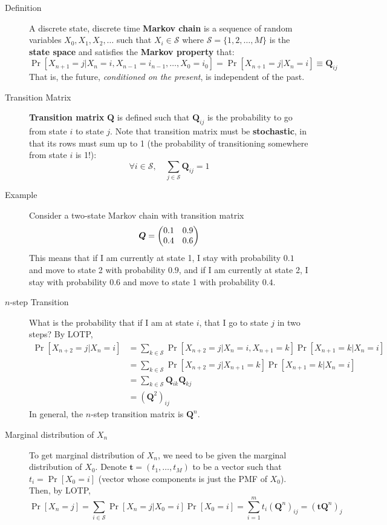 \documentclass[11pt]{article}
\theoremstyle{definition}
\theoremstyle{remark}
\begin{document}
\begin{description}

    \item[Definition] A discrete state, discrete time \textbf{Markov chain} is a sequence of random variables $X_0, X_1, X_2, \ldots$ such that $X_i \in \mathcal{S}$ where $\mathcal{S} = \{1, 2, \ldots, M\}$ is the \textbf{state space} and satisfies the \textbf{Markov property} that: $$\Pr[X_{n+1} = j | X_n = i, X_{n-1} = i_{n-1}, \ldots, X_0 = i_0 ] = \Pr[ X_{n+1} = j | X_{n} = i ] \equiv \bm{Q}_{ij}$$ That is, the future, \textit{conditioned on the present}, is independent of the past. 
    
    \item[Transition Matrix] \textbf{Transition matrix} $\bm{Q}$ is defined such that $\bm{Q}_{ij}$ is the probability to go from state $i$ to state $j$. Note that transition matrix must be \textbf{stochastic}, in that its rows must sum up to 1 (the probability of transitioning somewhere from state $i$ is 1!): $$ \forall i \in \mathcal{S}, \quad \sum_{j \in \mathcal{S}} \bm{Q}_{ij} = 1 $$ 
    
    \item[Example] Consider a two-state Markov chain with transition matrix $$\bm{Q} = \pmqty{ 0.1 & 0.9 \\ 0.4 & 0.6 } $$ This means that if I am currently at state 1, I stay with probability $0.1$ and move to state 2 with probability $0.9$, and if I am currently at state 2, I stay with probability $0.6$ and move to state 1 with probability $0.4$. 
    
    \item[$n$-step Transition] What is the probability that if I am at state $i$, that I go to state $j$ in two steps? By LOTP, \begin{align*} \Pr[X_{n+2} = j | X_{n} = i] & = \sum_{k \in \mathcal{S}} \Pr[X_{n+2} = j | X_{n} = i , X_{n+1} = k] \Pr[X_{n+1}=k | X_n = i] \\
    & = \sum_{k \in \mathcal{S}} \Pr[X_{n+2} = j | X_{n+1} = k] \Pr[X_{n+1}=k | X_n = i] \\
    & = \sum_{k \in \mathcal{S}}\bm{Q}_{ik}\bm{Q}_{kj} \\ 
    & = \left(\bm{Q}^2\right)_{ij} \end{align*} In general, the $n$-step transition matrix is $\bm{Q}^n$.
    
    \item[Marginal distribution of $X_n$] To get marginal distribution of $X_n$, we need to be given the marginal distribution of $X_0$. Denote $\bm{t} = (t_1, \ldots, t_M)$ to be a vector such that $t_i = \Pr[X_0 = i]$ (vector whose components is just the PMF of $X_0$). Then, by LOTP, $$\Pr[X_n = j] = \sum_{i \in \mathcal{S}} \Pr[X_n = j| X_0 = i] \Pr[X_0 = i] = \sum_{i=1}^m t_i (\bm{Q}^n)_{ij} = (\bm{t} \bm{Q}^n)_j $$
    

\end{description}
\end{document}
